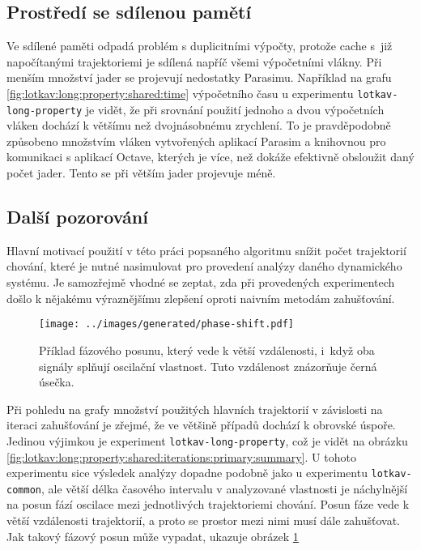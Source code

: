 \subsection{Prostředí se sdílenou pamětí}

Ve sdílené paměti odpadá problém s duplicitními výpočty, protože cache s~již napočítanými
trajektoriemi je sdílená napříč všemi výpočetními vlákny. Při menším množství jader se
projevují nedostatky Parasimu. Například na grafu \ref{fig:lotkav:long:property:shared:time} výpočetního času u experimentu \texttt{lotkav-long-property}
je vidět, že při srovnání použití jednoho a dvou výpočetních vláken dochází k většímu
než dvojnásobnému zrychlení. To je pravděpodobně způsobeno množstvím vlá\-ken vytvořených
aplikací Parasim a knihovnou pro komunikaci s aplikací Octave, kterých je více,
než dokáže efektivně obsloužit daný počet jader. Tento  se
při větším jader projevuje méně.

\subsection{Další pozorování}

Hlavní motivací použití v této práci popsaného algoritmu snížit počet trajektorií
chování, které je nutné nasimulovat pro provedení analýzy daného dynamického systému.
Je samozřejmě vhodné se zeptat, zda při provedených experimentech došlo k nějakému
výraznějšímu zlepšení oproti naivním metodám zahušťování. 

\begin{figure}[h!]
\begin{center}
	\texttt{[image: ../images/generated/phase-shift.pdf]}
	\caption{Příklad fázového posunu, který vede k větší vzdálenosti, i~když oba signály splňují oscilační vlastnost. Tuto vzdálenost znázorňuje černá úsečka.}
	\label{fig:phase:shift}
\end{center}
\end{figure}

Při pohledu na grafy množství použitých hlavních trajektorií v závislosti na iteraci
zahušťování je zřejmé, že ve většině případů dochází k obrovské úspoře. Jedinou výjimkou
je experiment \texttt{lotkav-long-property}, což je vidět na obrázku \ref{fig:lotkav:long:property:shared:iterations:primary:summary}.
U tohoto experimentu sice výsledek analýzy dopadne podobně jako u experimentu \texttt{lotkav-common},
ale větší délka časového intervalu v analyzované vlastnosti je náchylnější na posun fází oscilace
mezi jednotlivých trajektoriemi chování. Posun fáze vede k větší vzdálenosti trajektorií,
a proto se prostor mezi nimi musí dále zahušťovat. Jak takový fázový posun může vypadat, ukazuje
obrázek \ref{fig:phase:shift}

